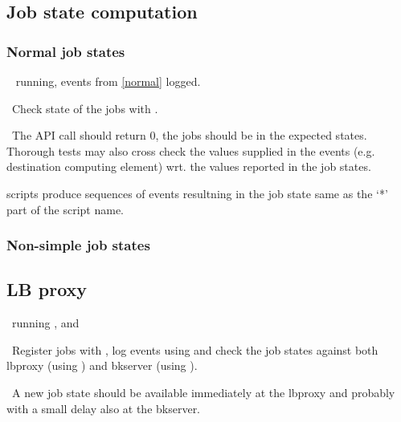 \subsection{Job state computation}

\subsubsection{Normal job states}
\label{state}
\req\  running, events from \ref{normal} logged.

\how\ Check state of the jobs with .

\result\ The API call should return 0, the jobs should be in the expected
states. Thorough tests may also cross check the values supplied in the
events (e.g. destination computing element) wrt. the values reported in the job states.

\begin{hints}
 scripts produce sequences of events resultning
in the job state same as the `*' part of the script name.
\end{hints}

\subsubsection{Non-simple job states}



\subsection{LB proxy}
\req\ running ,  and

\how\ Register jobs with , log events
using  and check the job states against
both lbproxy (using ) and bkserver
(using ).

\result\ A new job state should be available immediately at the
lbproxy and probably with a small delay also at the bkserver.

